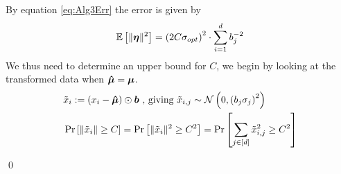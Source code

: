 \documentclass[a4paper,12pt]{article}
\renewenvironment{proof}{{\textit{Proof} \\}}{\qed}
\begin{document}
\begin{proof}
By equation \eqref{eq:Alg3Err} the error is given by
\begin{equation}
\label{eq:Alg3Err2}
    \mathbb{E} \left [ \| \bm{\eta} \|^2 \right] = \left (2C\sigma_{opt}\right)^2 \cdot 
    \sum_{i=1}^d b_j^{-2} 
\end{equation}
We thus need to determine an upper bound for $C$, we begin by looking at the transformed data
when $\bm{\hat{\mu}} = \bm{\mu}$.
\begin{align*}
    &\tilde{x}_i := (x_i - \bm{\hat{\mu}}) \odot \bm{b} \textnormal{ , giving } \tilde{x}_{i,j} \sim \mathcal{N}\left (0,\left (b_j\sigma_j\right)^2\right) \\
    &\Pr\left [ \| \tilde{x}_i \| \ge C \right] =
    \Pr\left [ \| \tilde{x}_i \|^2 \ge C^2 \right] =
    \Pr\left [ \sum_{j \in [d]} \tilde{x}_{i,j}^2 \ge C^2 \right]
\end{align*}


\end{proof}
\end{document}
